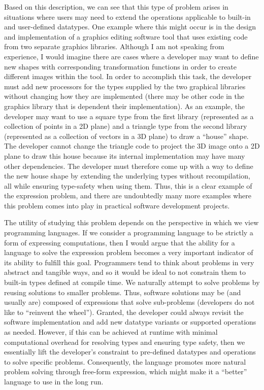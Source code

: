\documentclass[12pt,letterpaper]{article}
\begin{document}
Based on this description, we can see that this type of problem arises in  
situations where users may need to extend the operations applicable to built-in 
and user-defined datatypes. One example where this might occur is in the design and implementation of a graphics 
editing software tool that uses existing code from two separate graphics libraries. 
Although I am not speaking from experience, I would imagine there are cases where
a developer may want to define new shapes with corresponding transformation functions in order to create
different images within the tool. In order to accomplish this task, the developer must add new processors
for the types supplied by the two graphical libraries without changing how they are
implemented (there may be other code in the graphics library that is dependent their implementation). 
As an example, the developer may want to use a square type from the first library (represented as a collection of points
in a 2D plane) and a triangle type from the second library (represented as a collection
of vectors in a 3D plane) to draw a ``house'' shape. The developer cannot change the triangle code to 
project the 3D image onto a 2D plane to draw this house because its internal implementation may have many 
other dependencies. The developer must therefore come up with a way to define the new house shape 
by extending the underlying types without recompilation, all while ensuring type-safety when using them. Thus, this is a clear example of the 
expression problem, and there are undoubtedly many more examples where this problem comes into play in practical
software development projects.

The utility of studying this problem depends on the perspective in which we view programming languages. 
If we consider a programming language to be strictly a form of expressing computations, then I would 
argue that the ability for a language to solve the expression problem becomes a very important indicator of its ability to fulfill this goal. 
Programmers tend to think about problems in very abstract and tangible ways, and so it would be ideal
to not constrain them to built-in types defined at compile time. We naturally attempt to solve problems
by reusing solutions to smaller problems. Thus, software solutions may be (and usually are) 
composed of expressions that solve sub-problems (developers do not like to ``reinvent the wheel'').
Granted, the developer could always revisit the software implementation and add new
datatype variants or supported operations as needed. However, if this can be achieved at runtime with minimal computational
overhead for resolving types and ensuring type safety, then we essentially lift the developer's 
constraint to pre-defined datatypes and operations to solve specific problems. Consequently, 
the language promotes more natural problem solving through free-form expression, which might 
make it a ``better'' language to use in the long run.
\end{document}
